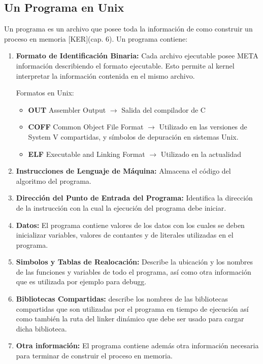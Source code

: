 \documentclass[../main.tex]{subfiles}
\begin{document}
    \subsection*{Un Programa en Unix}
        Un programa es un archivo que posee toda la información de como construir un proceso en memoria [KER](cap. 6). Un programa contiene:
        \begin{enumerate}
            \item \textbf{Formato de Identificación Binaria:} Cada archivo ejecutable posee META información describiendo el formato ejecutable. Esto permite al kernel interpretar la información contenida en el mismo archivo.
            
            Formatos en Unix:
            \begin{itemize}
                \item \textbf{OUT} Assembler Output $\rightarrow$ Salida del compilador de C
                \item \textbf{COFF} Common Object File Format $\rightarrow$ Utilizado en las versiones de System V compartidas, y símbolos de depuración en sistemas Unix.
                \item \textbf{ELF} Executable and Linking Format $\rightarrow$ Utilizado en la actualidad
               
            \end{itemize}

            \item \textbf{Instrucciones de Lenguaje de Máquina:} Almacena el código del algoritmo del programa.
            \item \textbf{Dirección del Punto de Entrada del Programa:} Identifica la dirección de la instrucción con la cual la ejecución del programa debe iniciar.
            \item \textbf{Datos:} El programa contiene valores de los datos con los cuales se deben inicializar variables, valores de contantes y de literales utilizadas en el programa.
            \item \textbf{Simbolos y Tablas de Realocación:} Describe la ubicación y los nombres de las funciones y variables de todo el programa, así como otra información que es utilizada por ejemplo para debugg.
            \item \textbf{Bibliotecas Compartidas:} describe los nombres de las bibliotecas compartidas que son utilizadas por el programa en tiempo de ejecución así como también la ruta del linker dinámico que debe ser usado para cargar dicha biblioteca.
            \item \textbf{Otra información:} El programa contiene además otra información necesaria para terminar de construir el proceso en memoria.
        \end{enumerate}
       
\end{document}
